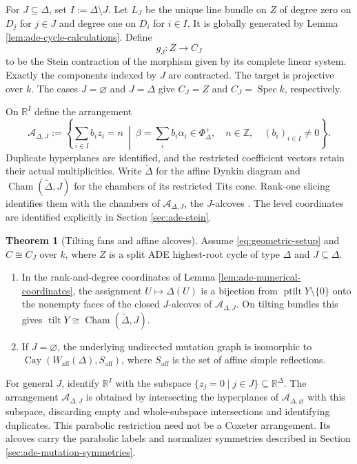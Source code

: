 \documentclass[a4paper,reqno]{amsart}
\DeclareMathOperator{\Spec}{Spec}
\DeclareMathOperator{\tilt}{tilt}
\DeclareMathOperator{\ptilt}{ptilt}
\theoremstyle{definition}
\newtheorem{Thm}{Theorem}[section]
\begin{document}
For $J\subseteq\Delta$, set $I:=\Delta\setminus J$. Let $L_J$ be the unique line bundle on $Z$ of degree zero on $D_j$ for $j\in J$ and degree one on $D_i$ for $i\in I$. It is globally generated by Lemma \ref{lem:ade-cycle-calculations}. Define
\[
g_J:Z\longrightarrow C_J
\]
to be the Stein contraction of the morphism given by its complete linear system. Exactly the components indexed by $J$ are contracted. The target is projective over $k$. The cases $J=\varnothing$ and $J=\Delta$ give $C_J=Z$ and $C_J=\Spec k$, respectively.

On $\mathbb R^I$ define the arrangement
\begin{equation}\label{eq:restricted-affine-ade-arrangement}
\mathscr A_{\Delta,J}:=
\left\{
\sum_{i\in I}b_i z_i=n
\ \middle|\
\beta=\sum_i b_i\alpha_i\in\Phi_\Delta^+,\quad
n\in\mathbb Z,\quad (b_i)_{i\in I}\ne0
\right\}.
\end{equation}
Duplicate hyperplanes are identified, and the restricted coefficient vectors retain their actual multiplicities. Write $\widetilde\Delta$ for the affine Dynkin diagram and $\operatorname{Cham}(\widetilde\Delta,J)$ for the chambers of its restricted Tits cone. Rank-one slicing identifies them with the chambers of $\mathscr A_{\Delta,J}$, the $J$-alcoves \cite[Theorem 1.12, Definitions 2.5--2.6 and Proposition 2.7]{IWTC}. The level coordinates are identified explicitly in Section \ref{sec:ade-stein}.

\begin{Thm}[Tilting fans and affine alcoves]\label{thm:ade-cycle-fan}
Assume \eqref{eq:geometric-setup} and $C\cong C_J$ over $k$, where $Z$ is a split ADE highest-root cycle of type $\Delta$ and $J\subseteq\Delta$.
\begin{enumerate}
\item In the rank-and-degree coordinates of Lemma \ref{lem:ade-numerical-coordinates}, the assignment $U\mapsto\Delta(U)$ is a bijection from $\ptilt Y\setminus\{0\}$ onto the nonempty faces of the closed $J$-alcoves of $\mathscr A_{\Delta,J}$. On tilting bundles this gives $\tilt Y\cong\operatorname{Cham}(\widetilde\Delta,J)$.
\item If $J=\varnothing$, the underlying undirected mutation graph is isomorphic to $\operatorname{Cay}(W_{\mathrm{aff}}(\Delta),S_{\mathrm{aff}})$, where $S_{\mathrm{aff}}$ is the set of affine simple reflections.
\end{enumerate}
\end{Thm}

For general $J$, identify $\mathbb R^I$ with the subspace $\{z_j=0\mid j\in J\}\subseteq\mathbb R^\Delta$. The arrangement $\mathscr A_{\Delta,J}$ is obtained by intersecting the hyperplanes of $\mathscr A_{\Delta,\varnothing}$ with this subspace, discarding empty and whole-subspace intersections and identifying duplicates. This parabolic restriction need not be a Coxeter arrangement. Its alcoves carry the parabolic labels and normalizer symmetries described in Section \ref{sec:ade-mutation-symmetries}.
\end{document}
